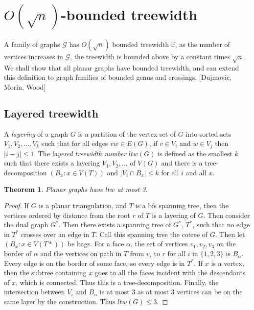 \documentclass[]{article}
\newtheorem{theorem}{Theorem}
\theoremstyle{definition}
\numberwithin{theorem}{section}
\numberwithin{equation}{section}
\begin{document}
\section{$O(\sqrt{n})$-bounded treewidth}
\newcommand{\ltw}{\textit{ltw}}
A family of graphs $\mathcal{G}$ has $O(\sqrt{n})$ bounded treewidth if, as the number of vertices increases in $\mathcal{G}$, the treewidth is bounded above by a constant times $\sqrt{n}$. We shall show that all planar graphs have bounded treewidth, and can extend this definition to graph families of bounded genus and crossings. [Dujmovic, Morin, Wood] 

\subsection{Layered treewidth}
A \textit{layering} of a graph $G$ is a partition of the vertex set of $G$ into sorted sets $V_1, V_2, ..., V_k$ such that for all edges $vw \in E(G)$, if $v \in V_i$ and $w \in V_j$ then $|i - j| \leq 1$. The \textit{layered treewidth number} $\ltw(G)$ is defined as the smallest $k$ such that there exists a layering $V_1, V_2, ...$ of $V(G)$ and there is a tree-decomposition $(B_x: x \in V(T))$ and $|V_i \cap B_x| \leq k$ for all $i$ and all $x$. 
\begin{theorem}
	Planar graphs have $\ltw$ at most 3. 
\end{theorem}
\begin{proof}
	If $G$ is a planar triangulation, and $T$ is a bfs spanning tree, then the vertices ordered by distance from the root $r$ of $T$ is a layering of $G$. Then consider the dual graph $G^*$. Then there exists a spanning tree of $G^*$, $T^*$, such that no edge in $T^*$ crosses over an edge in $T$. Call this spanning tree the cotree of $G$. Then let $\left( B_x: x \in V(T*) \right)$ be bags. For a face $\alpha$, the set of vertices $v_1, v_2, v_3$ on the border of $\alpha$ and the vertices on path in $T$ from $v_i$ to $r$ for all $i$ in $\lbrace 1, 2, 3 \rbrace$ is $B_\alpha$. Every edge is on the border of some face, so every edge is in $T^*$. If $x$ is a vertex, then the subtree containing $x$ goes to all the faces incident with the descendants of $x$, which is connected. Thus this is a tree-decomposition. Finally, the intersection between $V_i$ and $B_\alpha$ is at most 3 as at most 3 vertices can be on the same layer by the construction. Thus $ltw(G) \leq 3$. 
\end{proof}
\end{document}
